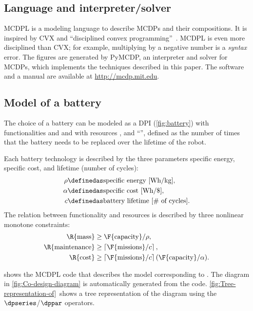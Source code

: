 \subsection{Language and interpreter/solver}

MCDPL is a modeling language to describe MCDPs and their compositions.
It is inspired by CVX and ``disciplined convex programming''~\cite{grant08graph}.
MCDPL is even more disciplined than CVX; for example, multiplying
by a negative number is a \emph{syntax} error. The figures are generated
by PyMCDP, an interpreter and solver for MCDPs, which implements the
techniques described in this paper. The software and a manual are
available at \url{http://mcdp.mit.edu}.

\subsection{Model of a battery}

The choice of a battery can be modeled as a DPI (\cref{fig:battery})
with functionalities  and 
and with resources ,  and ``'',
defined as the number of times that the battery needs to be replaced
over the lifetime of the robot.

Each battery technology is described by the three parameters specific
energy, specific cost, and lifetime (number of cycles):
\begin{align*}
    \rho & \definedas\text{specific energy [Wh/kg]},\\
    \alpha & \definedas\text{specific cost [Wh/\$]},\\
    c & \definedas\text{battery lifetime [\# of cycles]}.
\end{align*}
The relation between functionality and resources is described by three
nonlinear monotone constraints:
\begin{align}
    \R{\text{mass}} & \geq\F{\text{capacity}}/\rho,\label{eq:mass}\\
    \R{\text{maintenance}} & \geq\left\lceil \F{\text{missions}}/c\right\rceil ,\label{eq:maintenance}\\
    \R{\text{cost}} & \geq\left\lceil \F{\text{missions}}/c\right\rceil (\F{\text{capacity}}/\alpha).\label{eq:cost}
\end{align}

 shows the MCDPL code that describes the
model corresponding to .
The diagram in \cref{fig:Co-design-diagram} is automatically generated
from the code. \cref{fig:Tree-representation-of}~shows a tree representation
of the diagram using the $\dpseries$/$\dppar$ operators.

